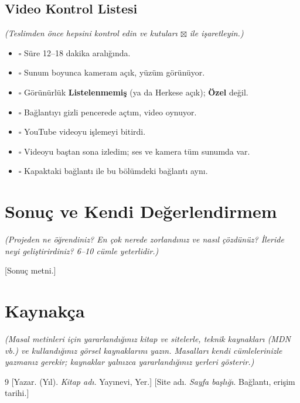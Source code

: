 \documentclass[12pt,a4paper]{article}
\newcommand{\aciklama}[1]{{\color{gray}\itshape (#1)}}
\begin{document}
\subsection{Video Kontrol Listesi}
\aciklama{Teslimden önce hepsini kontrol edin ve kutuları $\boxtimes$ ile işaretleyin.}
\begin{itemize}[label={}]
  \item $\square$ Süre 12--18 dakika aralığında.
  \item $\square$ Sunum boyunca kameram açık, yüzüm görünüyor.
  \item $\square$ Görünürlük \textbf{Listelenmemiş} (ya da Herkese açık); \textbf{Özel} değil.
  \item $\square$ Bağlantıyı gizli pencerede açtım, video oynuyor.
  \item $\square$ YouTube videoyu işlemeyi bitirdi.
  \item $\square$ Videoyu baştan sona izledim; ses ve kamera tüm sunumda var.
  \item $\square$ Kapaktaki bağlantı ile bu bölümdeki bağlantı aynı.
\end{itemize}

\section{Sonuç ve Kendi Değerlendirmem}
\aciklama{Projeden ne öğrendiniz? En çok nerede zorlandınız ve nasıl çözdünüz? İleride
neyi geliştirirdiniz? 6--10 cümle yeterlidir.}

[Sonuç metni.]

\section{Kaynakça}
\aciklama{Masal metinleri için yararlandığınız kitap ve sitelerle, teknik kaynakları
(MDN vb.) ve kullandığınız görsel kaynaklarını yazın. Masalları kendi
cümlelerinizle yazmanız gerekir; kaynaklar yalnızca yararlandığınız yerleri
gösterir.}

\begin{thebibliography}{9}
 [Yazar. (Yıl). \emph{Kitap adı}. Yayınevi, Yer.]
 [Site adı. \emph{Sayfa başlığı}. Bağlantı, erişim tarihi.]
\end{thebibliography}
\end{document}
